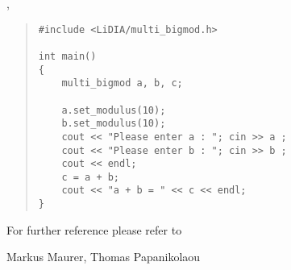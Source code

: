 \SEEALSO

, 



\EXAMPLES

\begin{quote}
\begin{verbatim}
#include <LiDIA/multi_bigmod.h>

int main()
{
    multi_bigmod a, b, c;

    a.set_modulus(10);
    b.set_modulus(10);
    cout << "Please enter a : "; cin >> a ;
    cout << "Please enter b : "; cin >> b ;
    cout << endl;
    c = a + b;
    cout << "a + b = " << c << endl;
}
\end{verbatim}
\end{quote}

For further reference please refer to 



\AUTHOR

Markus Maurer, Thomas Papanikolaou

